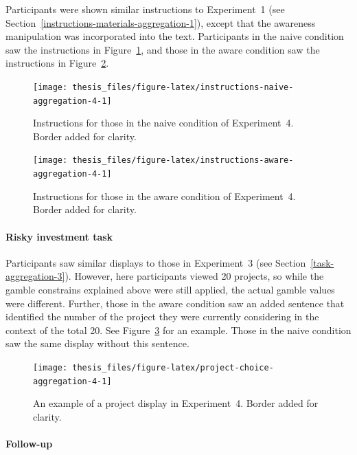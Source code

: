 \documentclass[a4paper, nobind, dvipsnames]{templates/ociamthesis}
\theoremstyle{definition}
\theoremstyle{definition}
\theoremstyle{definition}
\theoremstyle{definition}
\theoremstyle{remark}
\begin{document}
Participants were shown similar instructions to Experiment~1 (see
Section~\ref{instructions-materials-aggregation-1}), except that the awareness
manipulation was incorporated into the text. Participants in the naive condition
saw the instructions in Figure~\ref{fig:instructions-naive-aggregation-4}, and
those in the aware condition saw the instructions in
Figure~\ref{fig:instructions-aware-aggregation-4}.



\begin{figure}
\texttt{[image: thesis\_files/figure-latex/instructions-naive-aggregation-4-1]} \caption{Instructions for those in the naive condition of Experiment~4. Border added for clarity.}\label{fig:instructions-naive-aggregation-4}
\end{figure}



\begin{figure}
\texttt{[image: thesis\_files/figure-latex/instructions-aware-aggregation-4-1]} \caption{Instructions for those in the aware condition of Experiment~4. Border added for clarity.}\label{fig:instructions-aware-aggregation-4}
\end{figure}

\paragraph{Risky investment task}

Participants saw similar displays to those in Experiment~3 (see
Section~\ref{task-aggregation-3}). However, here participants viewed 20
projects, so while the gamble constrains explained above were still applied, the
actual gamble values were different. Further, those in the aware condition saw
an added sentence that identified the number of the project they were currently
considering in the context of the total 20. See
Figure~\ref{fig:project-choice-aggregation-4} for an example. Those in the
naive condition saw the same display without this sentence.



\begin{figure}
\texttt{[image: thesis\_files/figure-latex/project-choice-aggregation-4-1]} \caption{An example of a project display in Experiment~4. Border added for clarity.}\label{fig:project-choice-aggregation-4}
\end{figure}

\paragraph{Follow-up}
\end{document}
